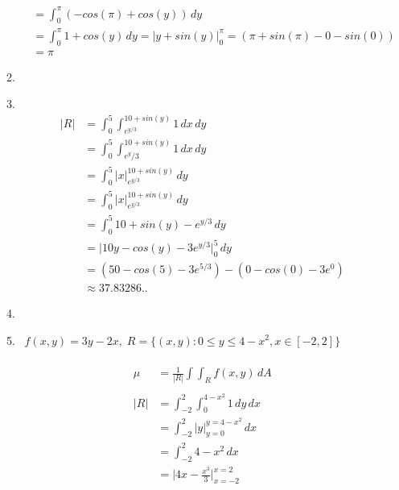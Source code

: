 \documentclass[11pt]{article}
\newcommand\Item[1][]{%
  \ifx\relax#1\relax  \item \else \item[#1] \fi
  \abovedisplayskip=0pt\abovedisplayshortskip=0pt~\vspace*{-\baselineskip}}
\begin{document}
\begin{preview}
\begin{enumerate}
\begin{enumerate}
\begin{align*}
                       & = \int_{0}^{\pi} (-cos(\pi) + cos(y))  \,dy                                                          \\
                       & = \int_{0}^{\pi} 1 + cos(y) \,dy = \Big| y + sin(y) \Big|_{0}^{\pi} = (\pi + sin(\pi) -  0 - sin(0)) \\
                       & = \pi
                  \end{align*}
                  \Item
                  \begin{align*}
                      |R| & = \int_{0}^{5} \int_{e^{y/3}}^{10+sin(y)} 1 \,dx  \,dy  \\
                          & = \int_{0}^{5} \int_{e^y/3}^{10+sin(y)} 1 \,dx  \,dy    \\
                          & = \int_{0}^{5} \Big| x \Big|_{e^{y/3}}^{10+sin(y)} \,dy \\
                          & = \int_{0}^{5} \Big| x \Big|_{e^{y/3}}^{10+sin(y)} \,dy \\
                          & = \int_{0}^{5} 10+sin(y) - e^{y/3} \,dy                 \\
                          & = \Big| 10y-cos(y) - 3e^{y/3} \Big|_{0}^{5} \,dy        \\
                          & = (50-cos(5) - 3e^{5/3}) - (0-cos(0) - 3e^{0})          \\
                          & \approx 37.83286..
                  \end{align*}
                  \Item $f(x,y) = 3y - 2x, \; R = \{(x,y):0 \le y \le 4-x^2, x \in [-2,2]\}$ \\\\
                  \begin{align*}
                      \mu & = \frac{1}{|R|} \int \int_R f(x,y) \,dA                                                    \\\\
                      |R| & = \int_{-2}^{2} \int_{0}^{4-x^{2}} 1 \,dy  \,dx                                            \\
                          & = \int_{-2}^{2} \Big| y \Big|_{y=0}^{y=4-x^{2}} \,dx                                       \\
                          & = \int_{-2}^{2} 4-x^{2} \,dx                                                               \\
                          & = \Big| 4x-\frac{x^{3}}{3} \Big|_{x=-2}^{x=2}                                              \\

\end{align*}
\end{enumerate}
\end{enumerate}
\end{preview}
\end{document}
